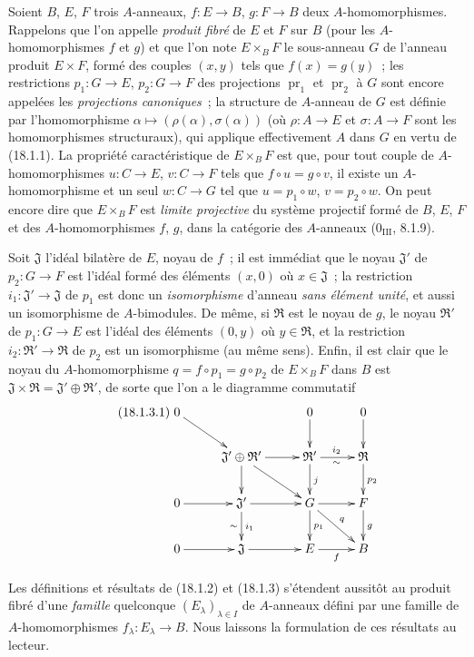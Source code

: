 \begin{env}[18.1.2]
\label{0.18.1.2-fr}
Soient $B$, $E$, $F$ trois $A$-anneaux, $f:E\to B$, $g:F\to B$ deux
$A$-homomorphismes. Rappelons que l'on appelle \emph{produit fibré} de $E$ et
$F$ sur $B$ (pour les $A$-homomorphismes $f$ et $g$) et que l'on note
$E\times_BF$ le sous-anneau $G$ de l'anneau produit $E\times F$, formé des
couples $(x,y)$ tels que $f(x)=g(y)$~; les restrictions $p_1:G\to E$,
$p_2:G\to F$ des projections $\operatorname{pr}_1$ et
$\operatorname{pr}_2$ à $G$ sont encore appelées les \emph{projections
canoniques}~; la structure de $A$-anneau de $G$ est définie par
l'homomorphisme $\alpha\mapsto(\rho(\alpha),\sigma(\alpha))$ (où
$\rho:A\to E$ et $\sigma:A\to F$ sont les homomorphismes structuraux), qui
applique effectivement $A$ dans $G$ en vertu de (18.1.1). La propriété
caractéristique de $E\times_BF$ est que, pour tout couple de
$A$-homomorphismes $u:C\to E$, $v:C\to F$ tels que
$f\circ u=g\circ v$, il existe un $A$-homomorphisme et un seul $w:C\to G$
tel que $u=p_1\circ w$, $v=p_2\circ w$. On peut encore dire que
$E\times_BF$ est \emph{limite projective} du système projectif formé de $B$,
$E$, $F$ et des $A$-homomorphismes $f$, $g$, dans la catégorie des
$A$-anneaux ($0_{\mathrm{III}}$, 8.1.9).
\end{env}

\begin{env}[18.1.3]
\label{0.18.1.3-fr}
Soit $\mathfrak{J}$ l'idéal bilatère de $E$, noyau de $f$~; il est immédiat
que le noyau $\mathfrak{J}'$ de $p_2:G\to F$ est l'idéal formé des éléments
$(x,0)$ où $x\in\mathfrak{J}$~; la restriction
$i_1:\mathfrak{J}'\to\mathfrak{J}$ de $p_1$ est donc un
\emph{isomorphisme} d'anneau \emph{sans élément unité}, et aussi un
isomorphisme de $A$-bimodules. De même, si $\mathfrak{R}$ est le noyau de
$g$, le noyau $\mathfrak{R}'$ de $p_1:G\to E$ est l'idéal des éléments
$(0,y)$ où $y\in\mathfrak{R}$, et la restriction
$i_2:\mathfrak{R}'\to\mathfrak{R}$ de $p_2$ est un isomorphisme (au même
sens). Enfin, il est clair que le noyau du $A$-homomorphisme
$q=f\circ p_1=g\circ p_2$ de $E\times_BF$ dans $B$ est
$\mathfrak{J}\times\mathfrak{R}=\mathfrak{J}'\oplus\mathfrak{R}'$, de sorte
que l'on a le diagramme commutatif
\begin{equation}
\label{0.18.1.3.1-fr}
\tag{18.1.3.1}
  \xymatrix@C=2.2pc@R=1.8pc{
    0\ar[dr] & & 0\ar[d] & 0\ar[d]\\
    & \mathfrak{J}'\oplus\mathfrak{R}'\ar[r]\ar[d]\ar[dr]
      & \mathfrak{R}'\ar[r]^{i_2}_{\sim}\ar[d]^j
      & \mathfrak{R}\ar[d]^{p_2}\\
    0\ar[r] & \mathfrak{J}'\ar[r]\ar[d]^{i_1}_{\sim}
      & G\ar[r]\ar[d]^{p_1}\ar[dr]^q & F\ar[d]^g\\
    0\ar[r] & \mathfrak{J}\ar[r] & E\ar[r]_f & B
  }
\end{equation}

Les définitions et résultats de (18.1.2) et (18.1.3) s'étendent aussitôt au
produit fibré d'une \emph{famille} quelconque $(E_\lambda)_{\lambda\in I}$ de
$A$-anneaux défini par une famille de $A$-homomorphismes
$f_\lambda:E_\lambda\to B$. Nous laissons la formulation de ces résultats au
lecteur.
\end{env}

